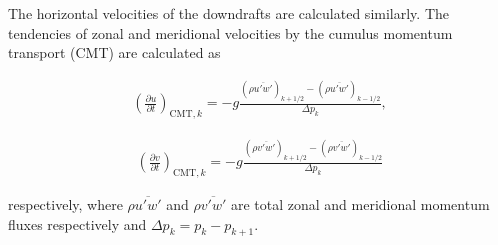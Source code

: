 The horizontal velocities of the downdrafts are calculated similarly. The tendencies of zonal and meridional velocities by the cumulus momentum transport (CMT) are calculated as

\begin{eqnarray}
 \left(\frac{\partial u}{\partial t}\right)_{\mathrm{CMT},k} = -g\frac{(\rho\overline{u'w'})_{k+1/2} - (\rho\overline{u'w'})_{k-1/2}}{\Delta p_k},
\end{eqnarray}

\begin{eqnarray}
 \left(\frac{\partial v}{\partial t}\right)_{\mathrm{CMT},k} = -g\frac{(\rho\overline{v'w'})_{k+1/2} - (\rho\overline{v'w'})_{k-1/2}}{\Delta p_k}
\end{eqnarray}

respectively, where \(\rho\overline{u'w'}\) and \(\rho\overline{v'w'}\) are total zonal and meridional momentum fluxes respectively and \(\Delta p_k = p_k - p_{k+1}\).
